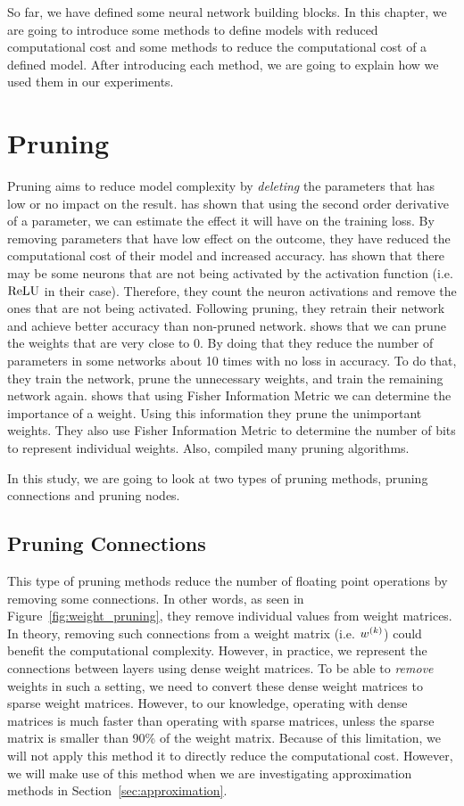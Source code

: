\label{cha:methods}
So far, we have defined some neural network building blocks. In this chapter, we are going to introduce some methods to define models with reduced computational cost and some methods to reduce the computational cost of a defined model. After introducing each method, we are going to explain how we used them in our experiments.

\section{Pruning}
\label{sec:pruning}
Pruning aims to reduce model complexity by \textit{deleting} the parameters that has low or no impact on the result. \cite{lecun1989optimal} has shown that using the second order derivative of a parameter, we can estimate the effect it will have on the training loss. By removing parameters that have low effect on the outcome, they have reduced the computational cost of their model and increased accuracy. \cite{Hu:2016aa} has shown that there may be some neurons that are not being activated by the activation function (i.e. $\textrm{ReLU}$ in their case). Therefore, they count the neuron activations and remove the ones that are not being activated. Following pruning, they retrain their network and achieve better accuracy than non-pruned network. \cite{han2015learning} shows that we can prune the weights that are very close to 0. By doing that they reduce the number of parameters in some networks about 10 times with no loss in accuracy. To do that, they train the network, prune the unnecessary weights, and train the remaining network again.  \cite{tu2016reducing} shows that using Fisher Information Metric we can determine the importance of a weight. Using this information they prune the unimportant weights. They also use Fisher Information Metric to determine the number of bits to represent individual weights. Also, \cite{reed1993pruning} compiled many pruning algorithms. 

In this study, we are going to look at two types of pruning methods, pruning connections and pruning nodes.

\subsection{Pruning Connections}
This type of pruning methods reduce the number of floating point operations by removing some connections. In other words, as seen in Figure~\ref{fig:weight_pruning}, they remove individual values from weight matrices. In theory, removing such connections from a weight matrix (i.e. $w^{(k)}$) could benefit the computational complexity. However, in practice, we represent the connections between layers using dense weight matrices. To be able to \textit{remove} weights in such a setting, we need to convert these dense weight matrices to sparse weight matrices. However, to our knowledge, operating with dense matrices is much faster than operating with sparse matrices, unless the sparse matrix is smaller than 90\% of the weight matrix. Because of this limitation, we will not apply this method it to directly reduce the computational cost. However, we will make use of this method when we are investigating approximation methods in Section~\ref{sec:approximation}.

